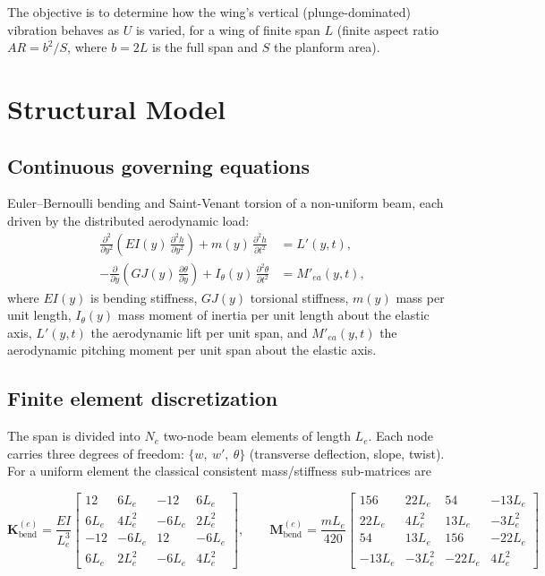 \documentclass[11pt]{article}
\begin{document}
The objective is to determine how the wing's vertical (plunge-dominated) vibration
behaves as $U$ is varied, for a wing of finite span $L$ (finite aspect ratio
$AR = b^2/S$, where $b=2L$ is the full span and $S$ the planform area).

\section{Structural Model}

\subsection{Continuous governing equations}

Euler--Bernoulli bending and Saint-Venant torsion of a non-uniform beam, each driven by
the distributed aerodynamic load:
\begin{align}
\frac{\partial^2}{\partial y^2}\!\left(EI(y)\,\frac{\partial^2 h}{\partial y^2}\right)
+ m(y)\,\frac{\partial^2 h}{\partial t^2}
&= L'(y,t), \label{eq:bending}\\[4pt]
-\frac{\partial}{\partial y}\!\left(GJ(y)\,\frac{\partial \theta}{\partial y}\right)
+ I_\theta(y)\,\frac{\partial^2 \theta}{\partial t^2}
&= M'_{ea}(y,t), \label{eq:torsion}
\end{align}
where $EI(y)$ is bending stiffness, $GJ(y)$ torsional stiffness, $m(y)$ mass per unit
length, $I_\theta(y)$ mass moment of inertia per unit length about the elastic axis,
$L'(y,t)$ the aerodynamic lift per unit span, and $M'_{ea}(y,t)$ the aerodynamic pitching
moment per unit span about the elastic axis.

\subsection{Finite element discretization}

The span is divided into $N_e$ two-node beam elements of length $L_e$. Each node
carries three degrees of freedom: $\{w,\ w',\ \theta\}$ (transverse deflection, slope,
twist). For a uniform element the classical consistent mass/stiffness sub-matrices are

\begin{equation}
\bm{K}^{(e)}_{\text{bend}} = \frac{EI}{L_e^3}
\begin{bmatrix}
12 & 6L_e & -12 & 6L_e\\
6L_e & 4L_e^2 & -6L_e & 2L_e^2\\
-12 & -6L_e & 12 & -6L_e\\
6L_e & 2L_e^2 & -6L_e & 4L_e^2
\end{bmatrix}, \qquad
\bm{M}^{(e)}_{\text{bend}} = \frac{mL_e}{420}
\begin{bmatrix}
156 & 22L_e & 54 & -13L_e\\
22L_e & 4L_e^2 & 13L_e & -3L_e^2\\
54 & 13L_e & 156 & -22L_e\\
-13L_e & -3L_e^2 & -22L_e & 4L_e^2
\end{bmatrix}
\end{equation}
\end{document}
